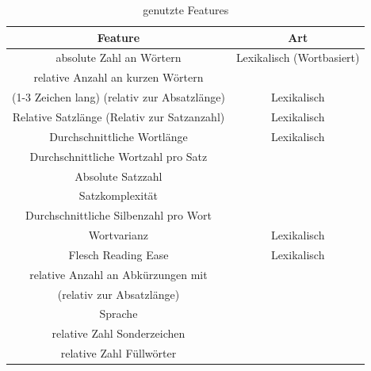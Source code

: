 \documentclass[conference]{IEEEtran}
\begin{document}
	\begin{table}[htbp]
		\caption{genutzte Features}
		\begin{center}
			\begin{tabular}{|c|c|}
				\hline
				\textbf{Feature} & \textbf{Art} \\
				\hline 
				absolute Zahl an Wörtern & Lexikalisch (Wortbasiert) \\
				\hline
				relative Anzahl an kurzen Wörtern \\ (1-3 Zeichen lang) (relativ zur Absatzlänge) & Lexikalisch \\
				\hline 
				Relative Satzlänge (Relativ zur Satzanzahl) & Lexikalisch \\
				\hline
				Durchschnittliche Wortlänge & Lexikalisch \\
				\hline
				Durchschnittliche Wortzahl pro Satz & \\
				\hline
				Absolute Satzzahl & \\
				\hline
				Satzkomplexität & \\
				\hline
				Durchschnittliche Silbenzahl pro Wort & \\
				\hline
				Wortvarianz & Lexikalisch \\
				\hline
				Flesch Reading Ease & Lexikalisch \\
				\hline
				relative Anzahl an Abkürzungen mit \grq \\(relativ zur Absatzlänge) & \\
				\hline 
				Sprache \cite{mf_b6} & \\
				\hline
				relative Zahl Sonderzeichen & \\
				\hline
				relative Zahl Füllwörter & \\
				\hline
			\end{tabular}
			\label{tab:features}
		\end{center}
	\end{table}
\end{document}

